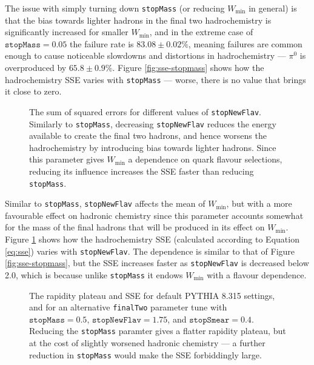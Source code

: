 \documentclass[12pt,a4paper]{report}
\begin{document}
The issue with simply turning down \texttt{stopMass} (or reducing $W_\text{min}$ in general) is that the bias towards lighter hadrons in the final two hadrochemistry is significantly increased for smaller $W_\text{min}$, and in the extreme case of $\texttt{stopMass} = 0.05$ the failure rate is $83.08 \pm 0.02 \%$, meaning failures are common enough to cause noticeable slowdowns and distortions in hadrochemistry --- $\pi^0$ is overproduced by $65.8 \pm 0.9 \%$. Figure \ref{fig:sse-stopmass} shows how the hadrochemistry SSE varies with \texttt{stopMass} --- worse, there is no value that brings it close to zero.

\begin{figure}
  \centering
  
  \caption{The sum of squared errors for different values of \texttt{stopNewFlav}. Similarly to \texttt{stopMass}, decreasing \texttt{stopNewFlav} reduces the energy available to create the final two hadrons, and hence worsens the hadrochemistry by introducing bias towards lighter hadrons. Since this parameter gives $W_\text{min}$ a dependence on quark flavour selections, reducing its influence increases the SSE faster than reducing \texttt{stopMass}.}
  \label{fig:sse-stopnewflav}
\end{figure}

\begin{sloppypar} Similar to \texttt{stopMass}, \texttt{stopNewFlav} affects the mean of $W_\text{min}$, but with a more favourable effect on hadronic chemistry since this parameter accounts somewhat for the mass of the final hadrons that will be produced in its effect on $W_\text{min}$. Figure \ref{fig:sse-stopnewflav} shows how the hadrochemistry SSE (calculated according to Equation \eqref{eq:sse}) varies with \texttt{stopNewFlav}. The dependence is similar to that of Figure \ref{fig:sse-stopmass}, but the SSE increases faster as \texttt{stopNewFlav} is decreased below 2.0, which is because unlike \texttt{stopMass} it endows $W_\text{min}$ with a flavour dependence. \end{sloppypar}

\begin{figure}
  \centering
  
  \caption{The rapidity plateau and SSE for default PYTHIA 8.315 settings, and for an alternative \texttt{finalTwo} parameter tune with $\texttt{stopMass} = 0.5$, $\texttt{stopNewFlav} = 1.75$, and $\texttt{stopSmear} = 0.4$. Reducing the \texttt{stopMass} paramter gives a flatter rapidity plateau, but at the cost of slightly worsened hadronic chemistry --- a further reduction in \texttt{stopMass} would make the SSE forbiddingly large.}
  \label{fig:dNdysse-goodtune}
\end{figure}
\end{document}
